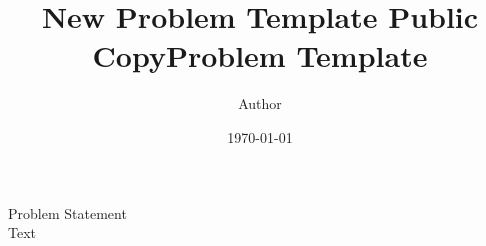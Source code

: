 \documentclass[letterpaper,12pt]{article}
\title{New Problem Template Public Copy}
\title{Problem Template}	%
\author{Author}		%
\date{\today}				%
\begin{document}
\noindent Problem Statement
\\
Text
\end{document}
